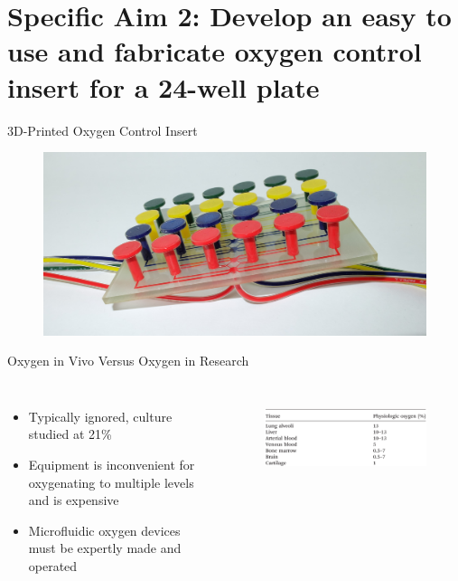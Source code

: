 \documentclass{beamer}
\begin{document}
\section{Specific Aim 2: Develop an easy to use and fabricate oxygen control insert for a 24-well plate}

\begin{frame}{3D-Printed Oxygen Control Insert}
\begin{figure}
\includegraphics[width=0.9\linewidth]{images/insert.JPG}
\end{figure}
\end{frame}

\begin{frame}{Oxygen in Vivo Versus Oxygen in Research}
\begin{columns}[c] %
\begin{itemize}
\item Typically ignored, culture studied at 21\%
\item Equipment is inconvenient for oxygenating to multiple levels and is expensive
\item Microfluidic oxygen devices must be expertly made and operated
\end{itemize}
\begin{figure}
\includegraphics[width=1\linewidth]{images/oxygen-table.png}\\
\hspace*{11pt}\hbox{\scriptsize {}}
 \end{figure}
\end{columns}
\end{frame}
\end{document}
